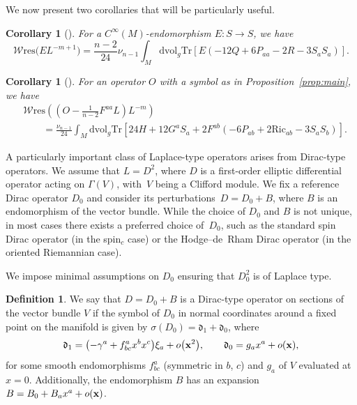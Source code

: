 \documentclass[10pt,a4paper]{amsart}
\numberwithin{equation}{section}
\newtheorem{Corollary}[Theorem]{Corollary}
\theoremstyle{definition}
\newtheorem{Definition}[Theorem]{Definition}
\def\W{\mathscr{W} \mathrm{res}}
\def\Tr{\mathrm{Tr}}
\def\dv{\mathrm{dvol}_g}
\begin{document}
We now present two corollaries that will be particularly useful.

\begin{Corollary}[{\cite[Corollary~I.3]{bochniak2025}}]
	\label{lemma:E}
	For a $C^\infty(M)$-endomorphism $E\colon S \to S$, we have
\[%
	\W\bigl(EL^{-m+1}\bigr)=\frac{n-2}{24}\nu_{n-1}\int_M \dv \Tr[E(-12Q+6P_{aa}-2R-3S_aS_a)].
\]
\end{Corollary}

\begin{Corollary}[{\cite[Corollary~I.4]{bochniak2025}}] \label{cor4}
	For an operator $O$ with a symbol as in Proposition~{\rm\ref{prop:main}},
	we have
		\begin{align*}
			& \W \left( \left(O - \frac{1}{n-2}F^{aa}L\right) L^{-m} \right)\\
&\qquad{} = 	
			\frac{\nu_{n-1}}{24}\int_M \dv \Tr[24H +12 G^aS_a + 2F^{ab}(-6P_{ab}+2 \mathrm{Ric}_{ab}-3S_aS_b)].
		\end{align*}
\end{Corollary}

A particularly important class of Laplace-type operators arises from Dirac-type operators. We assume that $L = D^2$, where $D$ is a first-order elliptic differential operator acting on $\Gamma(V)$, with~$V$ being a Clifford module. We fix a reference Dirac operator $D_0$ and consider its perturbations~${D = D_0 + B}$, where $B$ is an endomorphism of the vector bundle. While the choice of $D_0$ and $B$ is not unique, in most cases there exists a preferred choice of~$D_0$, such as the standard spin Dirac operator (in the spin${}_c$ case) or the Hodge--de~Rham Dirac operator (in the oriented Riemannian case).

We impose minimal assumptions on $D_0$ ensuring that $D_0^2$ is of Laplace type.

\begin{Definition}\label{defi2}
	We say that $D = D_0 + B$ is a Dirac-type operator on sections of the vector bundle $V$ if the symbol of $D_0$ in normal coordinates around a fixed point on the manifold is given by $\sigma(D_0)=\mathfrak{d}_1+\mathfrak{d}_0$,
	where
	\[\mathfrak{d}_1=\bigl(-\gamma^a+f^a_{bc}x^b x^c\bigr)\xi_a+ o\bigl({\bf x}^2\bigr), \qquad \mathfrak{d}_0= g_a x^a+ o({\bf x}),\]
	for some smooth endomorphisms $f^a_{bc}$ (symmetric in $b$, $c$) and $g_a$ of $V$ evaluated at $x=0$. Additionally, the endomorphism $B$ has an expansion
	$B=B_0+B_a x^a +o({\bf x})$.
\end{Definition}
\end{document}
